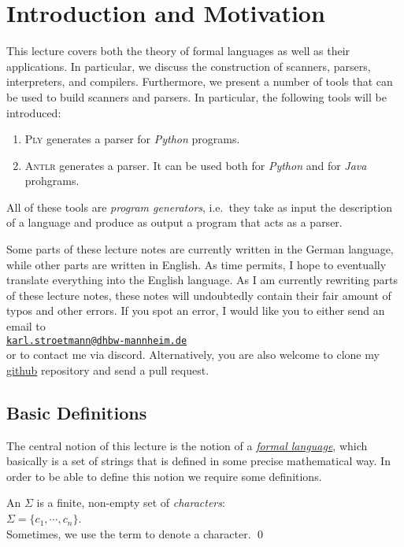 \chapter{Introduction and Motivation}
This lecture covers both the theory of formal languages as well as their applications.
In particular, we discuss the construction of scanners, parsers, interpreters, and compilers.  Furthermore, we 
present a number of tools that can be used to build scanners and parsers.  In particular, 
the following tools will be introduced:
\begin{enumerate}
\item \textsc{Ply}      generates a parser for \textsl{Python} programs. 
\item \textsc{Antlr}    generates a parser.  It can be used both for \textsl{Python} and for \textsl{Java} prohgrams.  
\end{enumerate}
All of these tools are \emph{program generators}, i.e.~they take as input the description of a
language and produce as output a program that acts as a parser. 

Some parts of these lecture notes are currently written in the German language, while other parts 
are written in English.  As time permits, I hope to eventually translate everything into the English language.
As I am currently rewriting parts of these lecture notes, these notes will undoubtedly contain their
fair amount of typos and other errors.  If you spot an error, I would like you to either
send an email to 
\\[0.2cm]
\hspace*{1.3cm}
\href{mailto:karl.stroetmann@dhbw-mannheim.de}{\texttt{karl.stroetmann@dhbw-mannheim.de}}
\\[0.2cm]
or to contact me via discord.  Alternatively, you are also welcome to clone my
\href{https://github.com/karlstroetmann/Formal-Languages/}{github} repository and send a pull request.

\section{Basic Definitions}
The central notion of this lecture is the notion of a 
\href{http://en.wikipedia.org/wiki/Formal_language}{\emph{formal language}},  which
basically is a set of strings that is defined in some precise mathematical way.  In order to be able to define
this notion we require some definitions.  

\begin{Definition}[Alphabet]
An  $\Sigma$  is a finite, non-empty set of \emph{characters}:
\\[0.2cm]
\hspace*{1.3cm}
$\Sigma = \{ c_1, \cdots, c_n \}$. 
\\[0.2cm]
Sometimes, we use the term   to denote a character.
\qed
\end{Definition}

